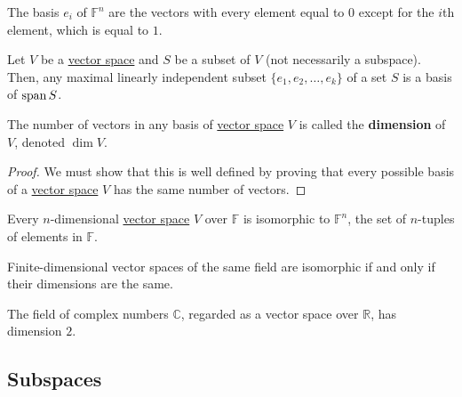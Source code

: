   \begin{example}
    \label{ex:standard-basis}
    The basis $e_i$ of $\mathbb{F}^n$ are the vectors with every element equal to $0$ except for the $i$th element, which is equal to $1$. 
  \end{example}

  \begin{theorem}
    \label{thm:maximally-independent-set-is-a-basis}
    Let $V$ be a \hyperref[def:vector-space]{vector space} and $S$ be a subset of $V$ (not necessarily a subspace). Then, any maximal linearly independent subset $\{ e_1, e_2, \ldots, e_k\}$ of a set $S$ is a basis of $\operatorname{span} S$. 
  \end{theorem}

  \begin{definition}[Dimension]
    \label{def:dimension}
    The number of vectors in any basis of \hyperref[def:vector-space]{vector space} $V$ is called the \textbf{dimension} of $V$, denoted $\dim{V}$. 
  \end{definition}
  \begin{proof}
    We must show that this is well defined by proving that every possible basis of a \hyperref[def:vector-space]{vector space} $V$ has the same number of vectors.
  \end{proof}

  \begin{theorem}
    \label{thm:isomorphism-to-fn}
    Every $n$-dimensional \hyperref[def:vector-space]{vector space} $V$ over $\mathbb{F}$ is isomorphic to $\mathbb{F}^n$, the set of $n$-tuples of elements in $\mathbb{F}$. 
  \end{theorem}

  \begin{corollary}
    \label{thm:isomorphism-between-n-dimensional-vector-spaces}
    Finite-dimensional vector spaces of the same field are isomorphic if and only if their dimensions are the same. 
  \end{corollary}

  \begin{example}
    \label{ex:c-as-a-real-vector-space}
    The field of complex numbers $\mathbb{C}$, regarded as a vector space over $\mathbb{R}$, has dimension $2$. 
  \end{example}

\subsection{Subspaces}

